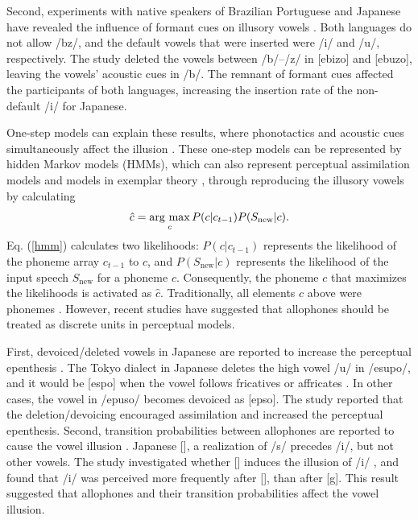\documentclass[a4paper,11pt,twocolumn]{article}
\newcommand{\argmax}{\mathop{\rm arg~max}\limits}
\begin{document}
Second, experiments with native speakers of Brazilian Portuguese and Japanese have revealed the influence of formant cues on illusory vowels \cite{dupoux2011illusory}. Both languages do not allow /bz/, and the default vowels that were inserted were /i/ and /u/, respectively. The study deleted the vowels between /b/--/z/ in [ebizo] and [ebuzo], leaving the vowels' acoustic cues in /b/. The remnant of formant cues affected the participants of both languages, increasing the insertion rate of the non-default /i/ for Japanese.

One-step models can explain these results, where phonotactics and acoustic cues simultaneously affect the illusion \cite{dupoux2011illusory}. These one-step models can be represented by hidden Markov models (HMMs), which can also represent perceptual assimilation models \cite{best2001discrimination} and models in exemplar theory \cite{lacerda1995perceptual}, through reproducing the illusory vowels \cite{kishiyama2021influence} by calculating
\begin{equation} \label{hmm}
    \hat{c} = \argmax_{c} P(c | c_{t-1})P(S_{\text{new}}|c).
\end{equation}
Eq. (\ref{hmm}) calculates two likelihoods: $P(c|c_{t-1})$ represents the likelihood of the phoneme array $c_{t-1}$ to $c$, and $P(S_{\text{new}}|c)$ represents the likelihood of the input speech $S_{\text{new}}$ for a phoneme $c$. Consequently, the phoneme $c$ that maximizes the likelihoods is activated as $\hat{c}$.
Traditionally, all elements $c$ above were phonemes \cite{wilson2013bayesian}. However, recent studies have suggested that allophones should be treated as discrete units in perceptual models.

First, devoiced/deleted vowels in Japanese are reported to increase the perceptual epenthesis \cite{kilpatrick2018japanese}. The Tokyo dialect in Japanese deletes the high vowel /u/ in /esupo/, and it would be [espo] when the vowel follows fricatives or affricates \cite{fujimoto2003devoice_eng, shaw2018lingual}. In other cases, the vowel in /epuso/ becomes devoiced as [ep\textsubring{\textturnm}so]. The study reported that the deletion/devoicing encouraged assimilation and increased the perceptual epenthesis. Second, transition probabilities between allophones are reported to cause the vowel illusion \cite{kilpatrick2020japanese}. Japanese [\textctc], a realization of /s/ precedes /i/, but not other vowels. The study investigated whether [\textctc{}] induces the illusion of /i/ \cite{kilpatrick2020japanese}, and found that /i/ was perceived more frequently after [\textctc], than after [g]. This result suggested that allophones and their transition probabilities affect the vowel illusion.
\end{document}
